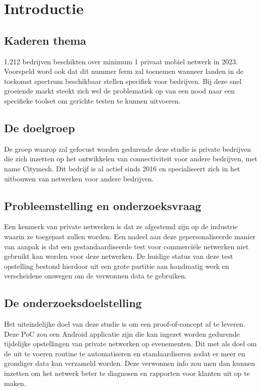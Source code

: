 
\section{Introductie}%
\label{sec:introductie}

\subsection{Kaderen thema}

1.212 bedrijven beschikten over minimum 1 privaat mobiel netwerk in 2023. Voorspeld word ook dat dit nummer ferm zal toenemen wanneer landen in de toekomst spectrum beschikbaar stellen specifiek voor bedrijven. \autocite{Dux2023} Bij deze snel groeiende markt steekt zich wel de problematiek op van een nood naar een specifieke toolset om gerichte testen te kunnen uitvoeren.

\subsection{De doelgroep}

De groep waarop zal gefocust worden gedurende deze studie is private bedrijven die zich inzetten op het ontwikkelen van connectiviteit voor andere bedrijven, met name Citymesh. Dit bedrijf is al actief sinds 2016 en specialiseert zich in het uitbouwen van netwerken voor andere bedrijven. \autocite{Cassauwers2019}

\subsection{Probleemstelling en onderzoeksvraag}

Een kenmerk van private netwerken is dat ze afgestemd zijn op de industrie waarin ze toegepast zullen worden. \autocite{Alen2020} Een nadeel aan deze gepersonaliseerde manier van aanpak is dat een gestandaardiseerde test voor commerciële netwerken niet gebruikt kan worden voor deze netwerken. De huidige status van deze test opstelling bestond hierdoor uit een grote partitie aan handmatig werk en verscheidene omwegen om de verwonnen data te gebruiken.

\subsection{De onderzoeksdoelstelling}

Het uiteindelijke doel van deze studie is om een proof-of-concept af te leveren. Deze PoC zou een Android applicatie zijn die kan ingezet worden gedurende tijdelijke opstellingen van private netwerken op evenementen. Dit met als doel om de uit te voeren routine te automatiseren en standaardiseren zodat er meer en grondiger data kan verzameld worden. Deze verwonnen info zou men dan kunnen inzetten om het netwerk beter te diagnosen en rapporten voor klanten uit op te maken.

